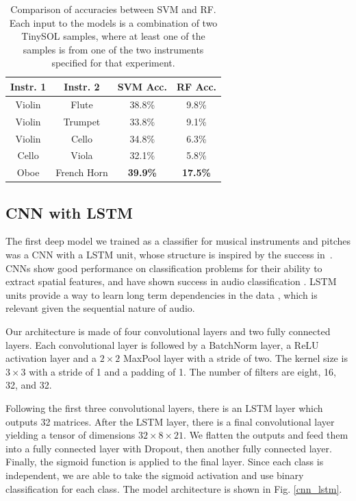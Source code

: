 \documentclass[runningheads,a4paper]{llncs}
\begin{document}
\begin{table}
  \centering
  \caption{Comparison of accuracies between SVM and RF. Each input to the models is a combination of two TinySOL samples, where at least one of the samples is from one of the two instruments specified for that experiment.}\label{tab:baselines}
    \begin{tabular}{|c|c|c|c|}
    	  \hline
      \textbf{Instr. 1} & \textbf{Instr. 2} & \textbf{SVM Acc.} & \textbf{RF Acc.}\\
      \hline
      Violin & Flute & 38.8\% & 9.8\% \\
      \hline
      Violin & Trumpet & 33.8\% & 9.1\% \\
      \hline
      Violin & Cello & 34.8\% & 6.3\% \\
      \hline
      Cello & Viola & 32.1\% & 5.8\% \\
      \hline
      Oboe & French Horn & \textbf{39.9\%} & \textbf{17.5\%} \\
      \hline
    \end{tabular}
\end{table}


\subsection{CNN with LSTM}

The first deep model we trained as a classifier for musical instruments and pitches was a CNN with a LSTM unit, whose structure is inspired by the success in~\cite{Salamon17}. CNNs show good performance on classification problems for their ability to extract spatial features, and have shown success in audio classification \cite{Hershey17}. LSTM units provide a way to learn long term dependencies in the data \cite{Hochreiter97}, which is relevant given the sequential nature of audio.

Our architecture is made of four convolutional layers and two fully connected layers. Each convolutional layer is followed by a BatchNorm layer, a ReLU activation layer and a $2 \times 2$  MaxPool layer with a stride of two. The kernel size is $3 \times 3$ with a stride of 1 and a padding of 1. The number of filters are eight, 16, 32, and 32.

Following the first three convolutional layers, there is an LSTM layer which outputs 32 matrices. After the LSTM layer, there is a final convolutional layer yielding a tensor of dimensions $32\times 8 \times 21$. We flatten the outputs and feed them into a fully connected layer with Dropout, then another fully connected layer. Finally, the sigmoid function is applied to the final layer. Since each class is independent, we are able to take the sigmoid activation and use binary classification for each class. The model architecture is shown in Fig. \ref{cnn_lstm}.
\end{document}
